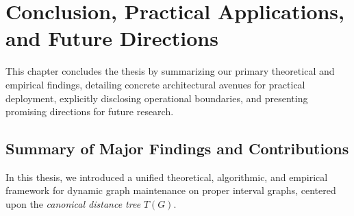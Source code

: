 \chapter{Conclusion, Practical Applications, and Future Directions}
\label{chap:conclusion}

This chapter concludes the thesis by summarizing our primary theoretical and empirical findings, detailing concrete architectural avenues for practical deployment, explicitly disclosing operational boundaries, and presenting promising directions for future research.

\section{Summary of Major Findings and Contributions}
\label{sec:conclusion_summary}

In this thesis, we introduced a unified theoretical, algorithmic, and empirical framework for dynamic graph maintenance on proper interval graphs, centered upon the \emph{canonical distance tree} $T(G)$. 

